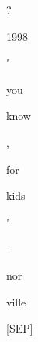 \documentclass[varwidth=150mm]{standalone}
\begin{document}
\begin{CJK*}{UTF8}{gbsn}
{{{\colorbox{red!12.941446304321289}{\strut ?} \colorbox{red!100.0}{\strut 1998} \colorbox{red!2.771723508834839}{\strut "} \colorbox{red!1.2159849405288696}{\strut you} \colorbox{red!1.861724615097046}{\strut know} \colorbox{red!3.1471238136291504}{\strut ,} \colorbox{red!2.1222622394561768}{\strut for} \colorbox{red!9.269782066345215}{\strut kids} \colorbox{red!1.419724702835083}{\strut "} \colorbox{red!4.530035972595215}{\strut -} \colorbox{red!2.5304887294769287}{\strut nor}\colorbox{red!28.462182998657227}{\strut ville} \colorbox{red!7.665227890014648}{\strut [SEP]}
}}}
\end{CJK*}
\end{document}
